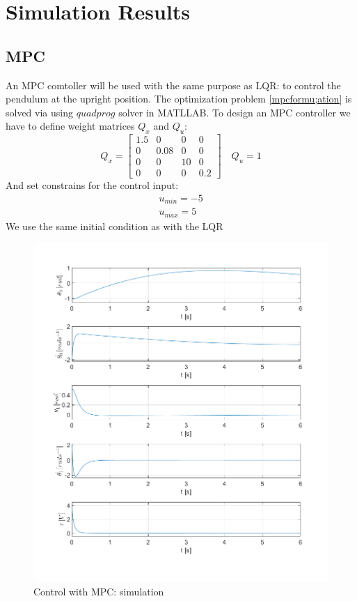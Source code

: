 \chapter{Simulation Results}
\section{MPC}
An MPC comtoller will be used with the same purpose as LQR: to control the pendulum at the upright position. The optimization problem \ref{mpcformu;ation} is solved via using $quadprog$ solver in MATLLAB.
To design an MPC controller we have to define weight matrices $Q_x$ and $Q_u$:
\begin{equation}
Q_x = \begin{bmatrix}
1.5&0&0&0\\
0&0.08&0&0\\
0&0&10&0\\
0&0&0&0.2
\end{bmatrix} \quad Q_u = 1
\end{equation}
And set constrains for the control input:
\begin{equation}
	\begin{split}
	u_{min} = -5\\
	u_{max} = 5
	\end{split}
\end{equation}
We use the same initial condition as with the LQR
\newpage
\begin{figure}[H]
	\centering
	\includegraphics[width=1.1\linewidth]{images/MPC}
	\caption{Control with MPC: simulation}
	\label{mpc}
\end{figure}
\newpage
